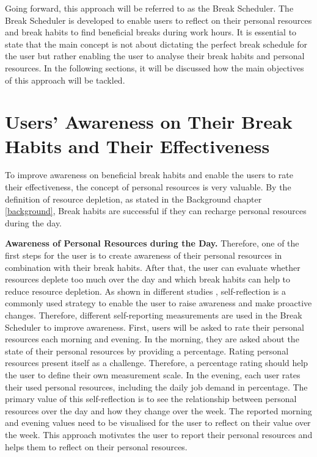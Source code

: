 \documentclass{hasel_thesis}
\begin{document}
Going forward, this approach  will be referred to as the Break Scheduler. The Break Scheduler is developed to enable users to reflect on their personal resources and break habits to find beneficial breaks during work hours. It is essential to state that the main concept is not about dictating the perfect break schedule for the user but rather enabling the user to analyse their break habits and personal resources. In the following sections, it will be discussed how the main objectives of this approach will be tackled.


\section{Users' Awareness on Their Break Habits and Their Effectiveness}
To improve awareness on beneficial break habits and enable the users to rate their effectiveness, the concept of personal resources is very valuable. By the definition of resource depletion, as stated in the Background chapter \ref{background}, Break habits are successful if they can recharge personal resources during the day. 

\textbf{Awareness of Personal Resources during the Day.}
Therefore, one of the first steps for the user is to create awareness of their personal resources in combination with their break habits. After that, the user can evaluate whether resources deplete too much over the day and which break habits can help to reduce resource depletion. As shown in different studies \cite{GRANT20083}, self-reflection is a commonly used strategy to enable the user to raise awareness and make proactive changes. Therefore, different self-reporting measurements are used in the Break Scheduler to improve awareness. First, users will be asked to rate their personal resources each morning and evening. In the morning, they are asked about the state of their personal resources by providing a percentage. Rating personal resources present itself as a challenge. Therefore, a percentage rating should help the user to define their own measurement scale. In the evening, each user rates their used personal resources, including the daily job demand in percentage. The primary value of this self-reflection is to see the relationship between personal resources over the day and how they change over the week. The reported morning and evening values need to be visualised for the user to reflect on their value over the week. This approach motivates the user to report their personal resources and helps them to reflect on their personal resources.
\end{document}
